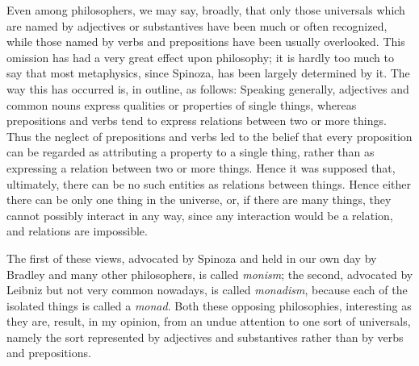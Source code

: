 \documentclass[oneside,letterpaper,12pt]{book}
\begin{document}
Even among philosophers, we may say, broadly, that only those universals
which are named by adjectives or substantives have been much or often
recognized, while those named by verbs and prepositions have been
usually overlooked. This omission has had a very great effect upon
philosophy; it is hardly too much to say that most metaphysics, since
Spinoza, has been largely determined by it. The way this has occurred
is, in outline, as follows: Speaking generally, adjectives and common
nouns express qualities or properties of single things, whereas
prepositions and verbs tend to express relations between two or more
things. Thus the neglect of prepositions and verbs led to the belief
that every proposition can be regarded as attributing a property to a
single thing, rather than as expressing a relation between two or more
things. Hence it was supposed that, ultimately, there can be no such
entities as relations between things. Hence either there can be only one
thing in the universe, or, if there are many things, they cannot
possibly interact in any way, since any interaction would be a relation,
and relations are impossible.

The first of these views, advocated by Spinoza and held in our own day
by Bradley and many other philosophers, is called \emph{monism}; the
second, advocated by Leibniz but not very common nowadays, is called
\emph{monadism}, because each of the isolated things is called a
\emph{monad}. Both these opposing philosophies, interesting as they are,
result, in my opinion, from an undue attention to one sort of
universals, namely the sort represented by adjectives and substantives
rather than by verbs and prepositions.
\end{document}
